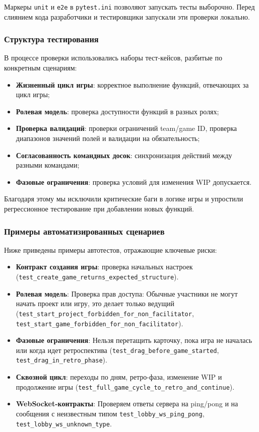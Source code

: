 Маркеры \texttt{unit} и \texttt{e2e} в \texttt{pytest.ini} позволяют запускать тесты выборочно. Перед слиянием кода разработчики и тестировщики запускали эти проверки локально.


\subsubsection{Структура тестирования} 
В процессе проверки использовались наборы тест-кейсов, разбитые по конкретным сценариям:

\begin{itemize}
    \item \textbf{Жизненный цикл игры}: корректное выполнение функций, отвечающих за цикл игры;
    \item \textbf{Ролевая модель}: проверка доступности функций в разных ролях;
    \item \textbf{Проверка валидаций}: проверки ограничений team/game ID, проверка диапазонов значений полей и валидации на обязательность;
    \item \textbf{Согласованность командных досок}: синхронизация действий между разными командами;
    \item \textbf{Фазовые ограничения}: проверка условий для изменения WIP допускается.
\end{itemize} 
Благодаря этому мы исключили критические баги в логике игры и упростили регрессионное тестирование при добавлении новых функций.

\subsubsection{Примеры автоматизированных сценариев}

Ниже приведены примеры автотестов, отражающие ключевые риски:

\begin{itemize}
    \item \textbf{Контракт создания игры}: проверка начальных настроек (\texttt{test\_\allowbreak create\_\allowbreak game\_\allowbreak returns\_\allowbreak expected\_\allowbreak structure}).
    \item \textbf{Ролевая модель}: Проверка прав доступа: Обычные участники не могут начать проект или игру, это делает только ведущий (\texttt{test\_start\_project\_forbidden\_for\_non\_facilitator}, \texttt{test\_start\_game\_forbidden\_for\_non\_facilitator}).
    \item \textbf{Фазовые ограничения}: Нельзя перетащить карточку, пока игра не началась или когда идет ретроспектива (\texttt{test\_drag\_before\_game\_started}, \texttt{test\_drag\_in\_retro\_phase}).
    \item \textbf{Сквозной цикл}: переходы по дням, ретро-фаза, изменение WIP и продолжение игры (\texttt{test\_\allowbreak full\_\allowbreak game\_\allowbreak cycle\_\allowbreak to\_\allowbreak retro\_\allowbreak and\_\allowbreak continue}).
    \item \textbf{WebSocket-контракты}: Проверяем ответы сервера на ping/pong и на сообщения с неизвестным типом \texttt{test\_lobby\_ws\_ping\_pong}, \texttt{test\_lobby\_ws\_unknown\_type}.
\end{itemize}


